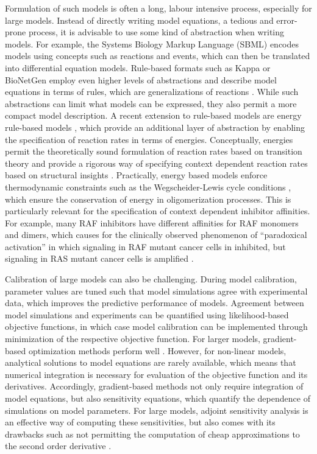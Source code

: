 \documentclass[11pt]{article}
\begin{document}
    Formulation of such models is often a long, labour intensive process,
especially for large models. Instead of directly writing model
equations, a tedious and error-prone process, it is advisable to use
some kind of abstraction when writing models. For example, the Systems
Biology Markup Language (SBML) \cite{2754712/NF7FZULE} encodes models
using concepts such as reactions and events, which can then be
translated into differential equation models. Rule-based formats such as
Kappa \cite{2754712/NAKF6985} or BioNetGen \cite{2754712/M82A4YPP}
employ even higher levels of abstractions and describe model equations
in terms of rules, which are generalizations of reactions
\cite{2754712/MIF24GAE}. While such abstractions can limit what models
can be expressed, they also permit a more compact model description. A
recent extension to rule-based models are energy rule-based models
\cite{2754712/6CAKFQQP} \cite{2754712/QTNJGKHE}, which provide an
additional layer of abstraction by enabling the specification of
reaction rates in terms of energies. Conceptually, energies permit the
theoretically sound formulation of reaction rates based on transition
theory and provide a rigorous way of specifying context dependent
reaction rates based on structural insights \cite{2754712/7TJH2IAK}
\cite{2754712/DI7IDWLV}. Practically, energy based models enforce
thermodynamic constraints such as the Wegscheider-Lewis cycle conditions
\cite{2754712/VAJ8A9TA}, which ensure the conservation of energy in
oligomerization processes. This is particularly relevant for the
specification of context dependent inhibitor affinities. For example,
many RAF inhibitors have different affinities for RAF monomers and
dimers, which causes for the clinically observed phenomenon of
``paradoxical activation'' in which signaling in RAF mutant cancer cells
in inhibited, but signaling in RAS mutant cancer cells is amplified
\cite{2754712/68C3KR4X} \cite{2754712/GPZDY42G} \cite{2754712/46UNKAAD}.

    Calibration of large models can also be challenging. During model
calibration, parameter values are tuned such that model simulations
agree with experimental data, which improves the predictive performance
of models. Agreement between model simulations and experiments can be
quantified using likelihood-based objective functions, in which case
model calibration can be implemented through minimization of the
respective objective function. For larger models, gradient-based
optimization methods perform well \cite{2754712/INKV577L}. However, for
non-linear models, analytical solutions to model equations are rarely
available, which means that numerical integration is necessary for
evaluation of the objective function and its derivatives. Accordingly,
gradient-based methods not only require integration of model equations,
but also sensitivity equations, which quantify the dependence of
simulations on model parameters. For large models, adjoint sensitivity
analysis is an effective way of computing these sensitivities, but also
comes with its drawbacks such as not permitting the computation of cheap
approximations to the second order derivative \cite{2754712/MKPQ9727}.
\end{document}
